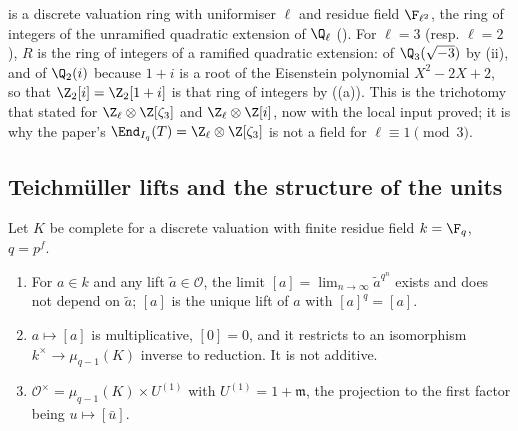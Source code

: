 \begin{example}
\begin{enumerate}[label=(\alph*)]
is a discrete valuation ring with uniformiser $\ell$ and residue field $\F_{\ell^2}$, the ring of integers of the unramified quadratic extension of
$\Q_\ell$ (). For $\ell=3$ (resp. $\ell=2$), $R$ is the ring of integers of a ramified quadratic extension:
of $\Q_3(\sqrt{-3})$ by (ii), and of $\Q_2(i)$ because $1+i$ is a root of the Eisenstein polynomial $X^2-2X+2$, so that
$\Z_2[i]=\Z_2[1+i]$ is that ring of integers by  ((a)). This is the trichotomy that  stated for $\Z_\ell\otimes\Z[\zeta_3]$ and
$\Z_\ell\otimes\Z[i]$, now with the local input proved; it is why the paper's $\End_{I_q}(T)=\Z_\ell\otimes\Z[\zeta_3]$ is not a field for
$\ell\equiv1\pmod3$.
\end{enumerate}
\end{example}

\subsection{Teichm\"uller lifts and the structure of the units}

\begin{theorem}\label{thm:local:teichmuller}
Let $K$ be complete for a discrete valuation with finite residue field $k=\F_q$, $q=p^f$.
\begin{enumerate}[label=(\roman*)]
\item For $a\in k$ and any lift $\tilde a\in\mathcal O$, the limit $[a]=\lim_{n\to\infty}\tilde a^{q^n}$ exists and does not depend on $\tilde a$; $[a]$ is the
unique lift of $a$ with $[a]^q=[a]$.
\item $a\mapsto[a]$ is multiplicative, $[0]=0$, and it restricts to an isomorphism $k^\times\to\mu_{q-1}(K)$ inverse to reduction. It is not
additive.
\item $\mathcal O^\times=\mu_{q-1}(K)\times U^{(1)}$ with $U^{(1)}=1+\mathfrak m$, the projection to the first factor being $u\mapsto[\bar u]$.
\end{enumerate}
\end{theorem}

